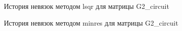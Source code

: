 \begin{figure}[H]
    \renewcommand{\figurename}{Рисунок}
    \caption{История невязок методом lsqr для матрицы G2\_circuit}
    \label{fig:image_48}
\end{figure}

\begin{figure}[H]
    \renewcommand{\figurename}{Рисунок}
    \caption{История невязок методом minres для матрицы G2\_circuit}
    \label{fig:image_49}
\end{figure}

